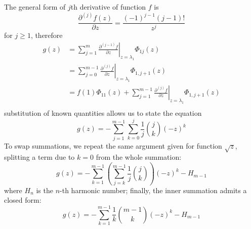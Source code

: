 The general form of $j$th derivative of function $f$ is 
$$\frac{\partial^{(j)}{f}(z)}{\partial{z}} =\frac{(-1)^{j-1}(j-1)!}{z^{j}}  $$ 
for $j \geq 1$, therefore
\begin{displaymath}
\begin{split}
  g(z) &= \sum_{j=1}^{m}{ \left. \frac{\partial^{(j-1)}{f}}{\partial{z}} \right|_{z=\lambda_{1}}\Phi_{1j}(z)} \\
       &= \sum_{j=0}^{m-1}{ \left. \frac{\partial^{(j)}{f}}{\partial{z}} \right|_{z=\lambda_{1}}\Phi_{1,j+1}(z)} \\
       &= f(1)\Phi_{11}(z) + \sum_{j=1}^{m-1}{ \left. \frac{\partial^{(j)}{f}}{\partial{z}} \right|_{z=\lambda_{1}}\Phi_{1,j+1}(z)} \\
\end{split}
\end{displaymath}
substitution of known quantities allows us to state the equation
\begin{equation}
  g(z) = - \sum_{j=1}^{m-1}{\sum_{k=0}^{j}{\frac{1}{j}{{j}\choose{k}}(-z)^{k}}}
\end{equation}
To swap summations, we repeat the same argument given for function $\sqrt{z}$, splitting
a term due to $k=0$ from the whole summation:
\begin{equation}
  g(z) = - \sum_{k=1}^{m-1}{\left(\sum_{j=k}^{m-1}{\frac{1}{j}{{j}\choose{k}}}\right)}(-z)^{k} - H_{m-1} 
\end{equation}
where $H_{n}$ is the $n$-th harmonic number; finally, the inner summation admits
a closed form:
\begin{equation}
  g(z) = - \sum_{k=1}^{m-1}\frac{1}{k}{{m-1}\choose{k}}{(-z)^{k}}- H_{m-1} 
\end{equation}

